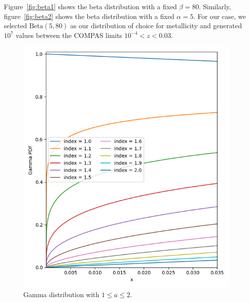 Figure~\ref{fig:beta1} shows the beta distribution with a fixed $\beta=80$.
Similarly, figure~\ref{fig:beta2} shows the beta distribution with a fixed $\alpha=5$.
For our case, we selected $\text{Beta}(5, 80)$ as our distribution of choice for metallicity and generated $10^7$ values between the COMPAS limits $10^{-4} < z < 0.03$. %

\begin{figure}[!ht]%
    \centering
    \includegraphics[width=\linewidth]{images/gamma}
    \caption{Gamma distribution with $1 \leq a \leq 2$.}
    \label{fig:gamma_distribution}
\end{figure}%
